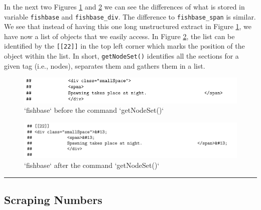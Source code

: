 \documentclass[
]{book}
\newenvironment{Shaded}{\begin{snugshade}}{\end{snugshade}}
\newcommand{\KeywordTok}[1]{\textcolor[rgb]{0.13,0.29,0.53}{\textbf{#1}}}
\newcommand{\NormalTok}[1]{#1}
\newcommand{\OperatorTok}[1]{\textcolor[rgb]{0.81,0.36,0.00}{\textbf{#1}}}
\newcommand{\StringTok}[1]{\textcolor[rgb]{0.31,0.60,0.02}{#1}}
\begin{document}
\begin{Shaded}
\end{Shaded}

In the next two Figures \ref{fig:before} and \ref{fig:after} we can see the differences of what is stored in variable \texttt{fishbase} and \texttt{fishbase\_div}. The difference to \texttt{fishbase\_span} is similar. We see that instead of having this one long unstructured extract in Figure \ref{fig:before}, we have now a list of objects that we easily access. In Figure \ref{fig:after}, the list can be identified by the \texttt{{[}{[}22{]}{]}} in the top left corner which marks the position of the object within the list. In short, \texttt{getNodeSet()} identifies all the sections for a given tag (i.e., nodes), separates them and gathers them in a list.

\begin{figure}
\includegraphics[width=11.47in]{./figures/before} \caption{`fishbase` before the command `getNodeSet()`}\label{fig:before}
\end{figure}

\begin{figure}
\includegraphics[width=12in]{./figures/after} \caption{`fishbase` after the command `getNodeSet()`}\label{fig:after}
\end{figure}

\begin{center}\rule{0.5\linewidth}{0.5pt}\end{center}

\hypertarget{scraping-numbers}{%
\subsection{Scraping Numbers}\label{scraping-numbers}}
\end{document}

